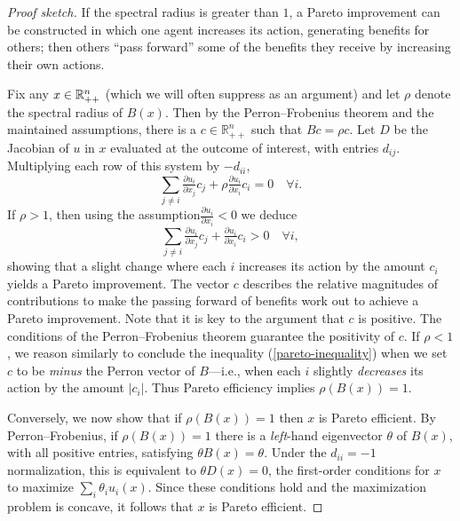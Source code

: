 \documentclass{notices}
\theoremstyle{definition}\newtheorem{problem}{Problem}
\begin{document}
\begin{proof}[Proof sketch] If the spectral radius is greater than $1$, a Pareto improvement can be constructed in which one agent increases its action, generating benefits for others; then others ``pass forward'' some of the benefits they receive by increasing their own actions.  


Fix any ${x} \in \mathbb R_{++}^n$ (which we will often suppress as an argument) and let  $\rho$ denote the spectral radius of ${B}({x})$. Then by the Perron--Frobenius theorem and the maintained assumptions, there is a $c\in \mathbb{R}^n_{++}$ such that ${B}c=\rho c$. Let ${D}$ be the Jacobian of $u$ in $x$ evaluated at the outcome of interest, with entries $d_{ij}$. Multiplying each row of this system by $-d_{ii}$,
$$  \sum_{j \neq i} \tfrac{\partial u_i}{\partial x_j} c_j + \rho \tfrac{\partial u_i}{\partial x_i} c_i = 0 \quad \forall i.$$
If $\rho>1$, then using the assumption$\frac{\partial u_i}{\partial x_i}<0$ we deduce
\begin{equation}   \sum_{j \neq i} \tfrac{\partial u_i}{\partial x_j} c_j + \tfrac{\partial u_i}{\partial x_i} c_i > 0 \quad \forall i,\label{pareto-inequality}\end{equation}
showing that a slight change where each $i$ increases its action by the amount $c_i$ yields a Pareto improvement. The vector ${c}$ describes the relative magnitudes of contributions to make the passing forward of benefits work out to achieve a Pareto improvement. Note that it is key to the argument that ${c}$ is positive. The conditions of the Perron--Frobenius theorem guarantee the positivity of ${c}$. If $\rho<1$, we reason similarly to conclude the inequality (\ref{pareto-inequality}) when we set ${c}$ to be \emph{minus} the Perron vector of ${B}$---i.e., when each $i$ slightly \emph{decreases} its action by the amount $|c_i|$. Thus Pareto efficiency implies $\rho({B}({x}))=1$.




Conversely, we now show that if $\rho({B}(x))=1$ then $x$ is Pareto efficient. By Perron--Frobenius, if $\rho(B(x))=1$ there is a \emph{left}-hand eigenvector ${\theta}$ of $B(x)$, with all positive entries, satisfying  ${\theta}{B}(x) = {\theta}$. Under the $d_{ii}=-1$ normalization, this is equivalent to ${\theta} D(x)=0$, the first-order conditions for $x$ to maximize $ \sum_i \theta_i u_i(x)$. Since these conditions hold and the maximization problem is concave, it follows that $x$ is Pareto efficient. \end{proof}
\end{document}
